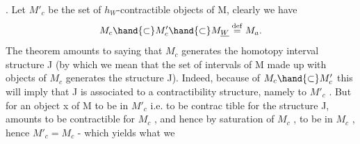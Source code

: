 \hand{\uline{\textcolor{black}{Proof}}}. Let $M'_c$ be the set of $h_W$-contractible objects of M, clearly we have
\[ M_c \hand{\subset} M'_c \hand{\subset} M_{\underline{W}} \overset{\mathrm{def}}{=} M_a . \]
The theorem amounts to saying that $M_c$ generates the homotopy interval
structure J (by which we mean that the set of intervals of M made up with
objects of $M_c$ generates the structure J). Indeed, because of $M_c \hand{\subset} M'_c$
this will imply that J is associated to a contractibility structure, 
 namely to $M'_c$ . But for an object x of M to be in $M'_c$ i.e. to be contrac%
tible for the structure J, amounts to be contractible for $M_c$ , and hence
by saturation of $M_c$ , to be in $M_c$ , hence $M'_c = M_c$ - which yields what we

